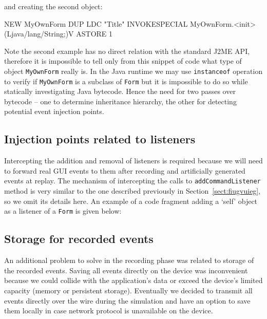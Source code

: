 \noindent%
and creating the second object: 

\begin{javablock}
NEW MyOwnForm
DUP
LDC "Title"
INVOKESPECIAL MyOwnForm.<init>(Ljava/lang/String;)V
ASTORE 1
\end{javablock}

Note the second example has no direct relation with the standard J2ME API, therefore
it is impossible to tell only from this snippet of code what type of object
\texttt{MyOwnForm} really is. In the Java runtime we may use \texttt{instanceof} operation
to verify if \texttt{MyOwnForm} is a subclass of \texttt{Form} but it is impossible to do so while
statically investigating Java bytecode. Hence the need for two passes over bytecode -- one to 
determine inheritance hierarchy, the other for detecting potential event injection points.


\subsection{Injection points related to listeners}

Intercepting the addition and removal of listeners is required because we will need to
forward real GUI events to them after recording and artificially generated 
events at replay. The mechanism of intercepting the calls to \texttt{addCommandListener}
method is very similar to the one described previously in Section~\ref{sect:fiugvuieg},
so we omit its details here. An example of a code fragment adding a `self' object as 
a listener of a \texttt{Form} is given below:

\begin{javablock}
public class MyClass implements CommandListener {
    public MyClass(Form f) {
        f.addCommandListener(this);
    }
...
\end{javablock}


\subsection{Storage for recorded events}

An additional problem to solve in the recording phase was related to storage
of the recorded events. Saving all events directly on the device was inconvenient
because we could collide with the application's data or exceed the device's limited
capacity (memory or persistent storage). Eventually we decided to transmit all
events directly over the wire during the simulation and have an option to save
them locally in case network protocol is unavailable on the device.



